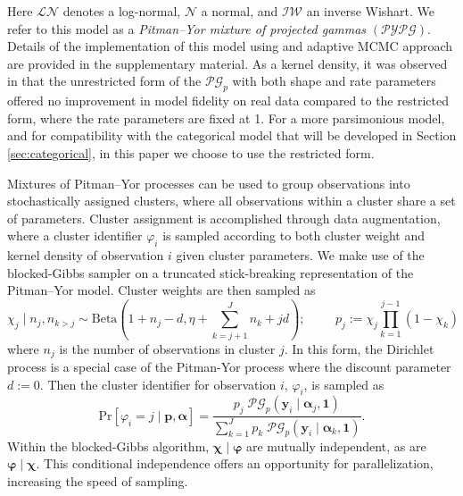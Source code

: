     Here $\mathcal{LN}$ denotes a log-normal, $\mathcal{N}$ a normal, and 
    $\mathcal{IW}$ an inverse Wishart.  We refer to this model as a
    \emph{Pitman--Yor mixture of projected gammas} $(\mathcal{PYPG})$.
    Details of the implementation of this 
    model using and adaptive MCMC approach are provided in the supplementary 
    material.  As a kernel density, it was observed in \cite{trubey:pg} that 
    the unrestricted form of the $\mathcal{PG}_p$ with both shape and rate 
    parameters offered no improvement in model fidelity on real data compared to 
    the restricted form, where the rate parameters are fixed at 1.  For a more 
    parsimonious model, and for compatibility with the categorical model
    that will be developed in Section \ref{sec:categorical}, in 
    this paper we choose to use the restricted form.

Mixtures of Pitman--Yor processes can be used to group 
    observations into stochastically assigned clusters, where all observations
    within a cluster share a set of parameters.  Cluster assignment is accomplished through data 
    augmentation, where a cluster identifier $\varphi_i$ is sampled according to
    both cluster weight and kernel density of observation $i$ given cluster parameters.
    We make use of the blocked-Gibbs sampler on a truncated stick-breaking representation of the
    Pitman--Yor model.  Cluster weights are then sampled as
    \begin{equation}
        \label{eqn:clusterweight}
        \chi_{j} \mid n_j, n_{k>j} \sim \text{Beta}\left(1 + n_j - d, 
            \eta + \sum_{k = j + 1}^J n_k + jd\right);
        \hspace{1cm}p_j := \chi_j \prod_{k = 1}^{j-1}(1 - \chi_k)
    \end{equation}
    where $n_j$ is the number of observations in cluster $j$.
    In this form, the Dirichlet process is a special case of the Pitman-Yor process
    where the discount parameter $d := 0$.
    Then the cluster identifier for observation $i$, $\varphi_i$, is sampled as
    \begin{equation}
        \label{eqn:clusterid}
        \text{Pr}\left[\varphi_i = j\mid \bm{p},\bm{\alpha}\right] =
            \frac{p_j\;\mathcal{PG}_p\left(\bm{y}_i\mid\bm{\alpha}_j,\bm{1}\right)}{
                \sum_{k = 1}^J p_k\;
                \mathcal{PG}_p\left(\bm{y}_i\mid\bm{\alpha}_k,\bm{1}\right)}.
    \end{equation}
    Within the blocked-Gibbs algorithm, $\bm{\chi}\mid\bm{\varphi}$ are mutually
    independent, as are $\bm{\varphi}\mid\bm{\chi}$.  This conditional independence
    offers an opportunity for parallelization, increasing the speed of sampling.
    
